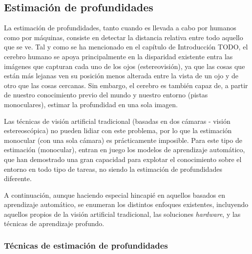 \subsection{Estimación de profundidades}
La estimación de profundidades, tanto cuando es llevada a cabo por humanos como por máquinas, consiste en detectar la distancia relativa entre todo aquello que se ve. Tal y como se ha mencionado en el capítulo de Introducción TODO, el cerebro humano se apoya principalmente en la disparidad existente entra las imágenes que capturan cada uno de los ojos (estereovisión), ya que las cosas que están más lejanas ven su posición menos alterada entre la vista de un ojo y de otro que las cosas cercanas. Sin embargo, el cerebro es también capaz de, a partir de nuestro conocimiento previo del mundo y nuestro entorno (pistas monoculares), estimar la profundidad en una sola imagen. 

Las técnicas de visión artificial tradicional (basadas en dos cámaras - visión estereoscópica) no pueden lidiar con este problema, por lo que la estimación monocular (con una sola cámara) es prácticamente imposible. Para este tipo de estimación (monocular), entran en juego los modelos de aprendizaje automático, que han demostrado una gran capacidad para explotar el conocimiento sobre el entorno en todo tipo de tareas, no siendo la estimación de profundidades diferente. 

A continuación, aunque haciendo especial hincapié en aquellos basados en aprendizaje automático, se enumeran los distintos enfoques existentes, incluyendo aquellos propios de la visión artificial tradicional, las soluciones \textit{hardware}, y las técnicas de aprendizaje profundo.

\subsubsection{Técnicas de estimación de profundidades} \label{estimacion-profundidades-sota}

